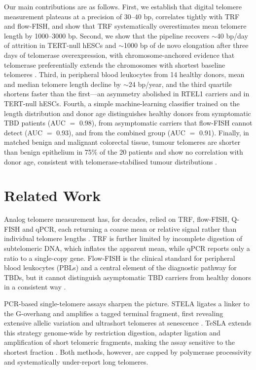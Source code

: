 \documentclass[11pt]{article}
\begin{document}
Our main contributions are as follows. First, we establish that digital
telomere measurement plateaus at a precision of 30--40 bp, correlates
tightly with TRF and flow-FISH, and show that TRF systematically
overestimates mean telomere length by 1000--3000 bp. Second, we show
that the pipeline recovers $\sim$40 bp/day of attrition in TERT-null
hESCs and $\sim$1000 bp of de novo elongation after three days of
telomerase overexpression, with chromosome-anchored evidence that
telomerase preferentially extends the chromosomes with shortest baseline
telomeres
\citep{hemann2001shortest,britt2012preferential,teixeira2004intertelomere}.
Third, in peripheral blood leukocytes from 14 healthy donors, mean and
median telomere length decline by $\sim$24 bp/year, and the third
quartile shortens faster than the first---an asymmetry abolished in
RTEL1 carriers and in TERT-null hESCs. Fourth, a simple machine-learning
classifier trained on the length distribution and donor age distinguishes
healthy donors from symptomatic TBD patients (AUC $=$ 0.98), from
asymptomatic carriers that flow-FISH cannot detect (AUC $=$ 0.93), and
from the combined group (AUC $=$ 0.91). Finally, in matched benign and
malignant colorectal tissue, tumour telomeres are shorter than benign
epithelium in 75\% of the 20 patients and show no correlation with donor
age, consistent with telomerase-stabilised tumour distributions
\citep{barthel2017systematic,roka2023tumor}.

\section{Related Work}

Analog telomere measurement has, for decades, relied on TRF, flow-FISH,
Q-FISH and qPCR, each returning a coarse mean or relative signal rather
than individual telomere lengths
\citep{aubert2012telomere,baerlocher2006flow,cawthon2002telomere,lai2017comparison}.
TRF is further limited by incomplete digestion of subtelomeric DNA,
which inflates the apparent mean, while qPCR reports only a ratio to a
single-copy gene. Flow-FISH is the clinical standard for peripheral
blood leukocytes (PBLs) and a central element of the diagnostic pathway
for TBDs, but it cannot distinguish asymptomatic TBD carriers from
healthy donors in a consistent way \citep{alder2018diagnostic}.

PCR-based single-telomere assays sharpen the picture. STELA ligates a
linker to the G-overhang and amplifies a tagged terminal fragment, first
revealing extensive allelic variation and ultrashort telomeres at
senescence \citep{baird2003extensive}. TeSLA extends this strategy
genome-wide by restriction digestion, adapter ligation and amplification
of short telomeric fragments, making the assay sensitive to the shortest
fraction \citep{lai2018comparison}. Both methods, however, are capped by
polymerase processivity and systematically under-report long telomeres.
\end{document}
